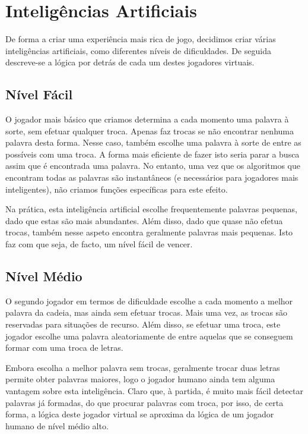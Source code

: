 \documentclass[12pt,a4paper,reqno]{report}
\numberwithin{equation}{section}
\begin{document}
\chapter{Inteligências Artificiais}

De forma a criar uma experiência mais rica de jogo, decidimos criar várias inteligências artificiais, como diferentes níveis de dificuldades. De seguida descreve-se a lógica por detrás de cada um destes jogadores virtuais.

\section{Nível Fácil}

O jogador mais básico que criamos determina a cada momento uma palavra à sorte, sem efetuar qualquer troca. Apenas faz trocas se não encontrar nenhuma palavra desta forma. Nesse caso, também escolhe uma palavra à sorte de entre as possíveis com uma troca. A forma mais eficiente de fazer isto seria parar a busca assim que é encontrada uma palavra. No entanto, uma vez que os algoritmos que encontram todas as palavras são instantâneos (e necessários para jogadores mais inteligentes), não criamos funções específicas para este efeito.

Na prática, esta inteligência artificial escolhe frequentemente palavras pequenas, dado que estas são mais abundantes. Além disso, dado que quase não efetua trocas, também nesse aspeto encontra geralmente palavras mais pequenas. Isto faz com que seja, de facto, um nível fácil de vencer.

\section {Nível Médio}

O segundo jogador em termos de dificuldade escolhe a cada momento a melhor palavra da cadeia, mas ainda sem efetuar trocas. Mais uma vez, as trocas são reservadas para situações de recurso. Além disso, se efetuar uma troca, este jogador escolhe uma palavra aleatoriamente de entre aquelas que se conseguem formar com uma troca de letras.

Embora escolha a melhor palavra sem trocas, geralmente trocar duas letras permite obter palavras maiores, logo o jogador humano ainda tem alguma vantagem sobre esta inteligência. Claro que, à partida, é muito mais fácil detectar palavras já formadas, do que procurar palavras com troca, por isso, de certa forma, a lógica deste jogador virtual se aproxima da lógica de um jogador humano de nível médio alto.
\end{document}
